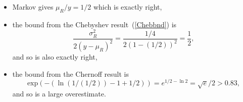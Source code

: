\documentclass[11pt]{article}
\begin{document}
\begin{problem}
\begin{problemparts}
{\begin{itemize}
\item Markov gives $\mu_R/y = 1/2$ which is exactly right,

\item the bound from the Chebyshev result~(\ref{Chebbnd}) is
\[
\frac{\sigma_R^2}{2(y - \mu_R)^2} = \frac{1/4}{2(1-(1/2))^2} = \frac{1}{2},
\]
and so is also exactly right,

\item the bound from the Chernoff result is
\[
\text{exp}(- (\ln (1/(1/2)) - 1 + 1/2)) = e^{1/2 - \ln 2} = \sqrt{e}/2 > 0.83,
\]
and so is a large overestimate.

\end{itemize}
}

\iffalse
\problempart Discuss when the Chebyshev bound on $\pr{R > c\expect{R}}$ is
tighter than the Chernoff bound, where R is positive and $c>1$. (Providing
an example is sufficient.)

\solution{Consider the case where $c$ is small, that is, $c=1+\epsilon$
and $\epsilon < 1$.  Assume that $\variance{R}=\expect{R}=1$.  The
Chernoff bound is $e^{-(c\ln{c}-c+1)}$.  Numerical experiments show that
\[
\frac{1}{1+\epsilon^2} < e^{-(c\ln{c}-c+1)}.
\]
Therefore, the Chebyshev one-sided bound on $\pr{R>c\expect{R}}$ is
tighter than the Chernoff bound.}
\fi

\end{problemparts}
\end{problem}


%
\end{document}
